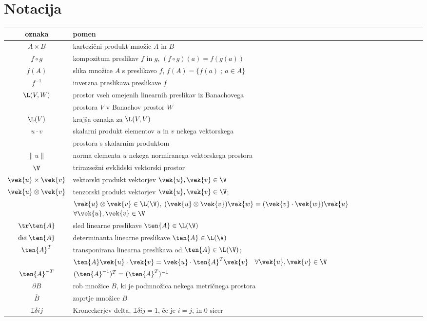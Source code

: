 \chapter*{Notacija}


\begin{center}\begin{tabular}[h]{|c|p{11cm}|}
	\hline oznaka & pomen \\ \hline%
	$A\times B$ & kartezični produkt množic $A$ in $B$ \\ %
	$f\circ g$ & kompozitum preslikav $f$ in $g$, $(f\circ g)(a)=f(g(a))$ \\ %
	$f(A)$ & slika množice $A$ s preslikavo $f$, $f(A)=\{f(a)\;;\ a\in A\}$ \\ %
	$f^{-1}$ & inverzna preslikava preslikave $f$ \\ %
	$\L(V,W)$ & prostor vseh omejenih linearnih preslikav iz Banachovega \\ &
	prostora $V$ v Banachov prostor $W$ \\ %
	$\L(V)$ & krajša oznaka za $\L(V,V)$ \\ %
	$u\cdot v$ & skalarni produkt elementov $u$ in $v$ nekega vektorskega \\ &
	prostora s skalarnim produktom \\ %
	$\|u\|$ & norma elementa $u$ nekega normiranega vektorskega prostora \\ %
	$\V$ & trirazsežni evklidski vektorski prostor \\ %
	$\vek{u}\times\vek{v}$ & vektorski produkt vektorjev $\vek{u},\vek{v}\in\V$ \\ %
	$\vek{u}\otimes\vek{v}$ & tenzorski produkt vektorjev $\vek{u},\vek{v}\in\V$; \\
	& $\vek{u}\otimes\vek{v}\in\L(\V)$, $(\vek{u}\otimes\vek{v})\vek{w}=
	(\vek{v}\cdot\vek{w})\vek{u}$ \ $\forall\vek{u},\vek{v}\in\V$ \\ %
	$\tr\ten{A}$ & sled linearne preslikave $\ten{A}\in\L(\V)$ \\ %
	$\det\ten{A}$ & determinanta linearne preslikave $\ten{A}\in\L(\V)$ \\ %
	$\ten{A}^{T}$ & transponirana linearna preslikava od $\ten{A}\in\L(\V)$; \\
	& $\ten{A}\vek{u}\cdot\vek{v}=\vek{u}\cdot\ten{A}^{T}\vek{v}$ \ $\forall\vek{u},\vek{v}\in\V$ \\ %
	$\ten{A}^{-T}$ & $(\ten{A}^{-1})^{T}=(\ten{A}^{T})^{-1}$ \\ %
	$\partial B$ & rob množice $B$, ki je podmnožica nekega metričnega prostora \\ %
	$\overline{B}$ & zaprtje množice $B$ \\ %
	$\topbot{\delta}{i}{j}$ & Kroneckerjev delta, $\topbot{\delta}{i}{j}=1$, če je $i=j$, in 0 sicer \\ \hline
\end{tabular}\end{center}

